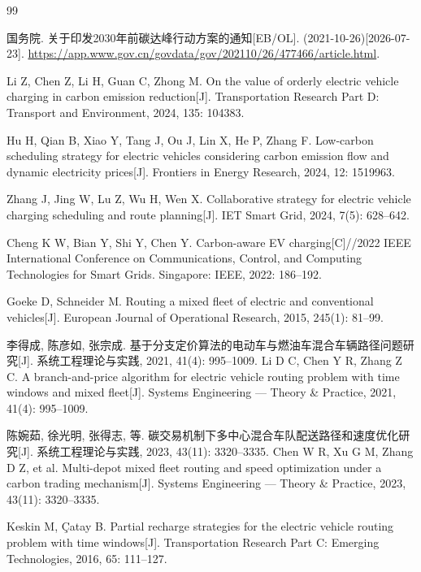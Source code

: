 \documentclass{setp-new}
\begin{document}

\begin{thebibliography}{99}

 国务院. 关于印发2030年前碳达峰行动方案的通知[EB/OL]. (2021-10-26)[2026-07-23].
\url{https://app.www.gov.cn/govdata/gov/202110/26/477466/article.html}.

 Li Z, Chen Z, Li H, Guan C, Zhong M. On the value of orderly electric vehicle charging in carbon emission reduction[J]. Transportation Research Part D: Transport and Environment, 2024, 135: 104383.

 Hu H, Qian B, Xiao Y, Tang J, Ou J, Lin X, He P, Zhang F. Low-carbon scheduling strategy for electric vehicles considering carbon emission flow and dynamic electricity prices[J]. Frontiers in Energy Research, 2024, 12: 1519963.

 Zhang J, Jing W, Lu Z, Wu H, Wen X. Collaborative strategy for electric vehicle charging scheduling and route planning[J]. IET Smart Grid, 2024, 7(5): 628--642.

 Cheng K W, Bian Y, Shi Y, Chen Y. Carbon-aware EV charging[C]//2022 IEEE International Conference on Communications, Control, and Computing Technologies for Smart Grids. Singapore: IEEE, 2022: 186--192.

 Goeke D, Schneider M. Routing a mixed fleet of electric and conventional vehicles[J]. European Journal of Operational Research, 2015, 245(1): 81--99.

 李得成, 陈彦如, 张宗成. 基于分支定价算法的电动车与燃油车混合车辆路径问题研究[J]. 系统工程理论与实践, 2021, 41(4): 995--1009.\newline
Li D C, Chen Y R, Zhang Z C. A branch-and-price algorithm for electric vehicle routing problem with time windows and mixed fleet[J]. Systems Engineering --- Theory \& Practice, 2021, 41(4): 995--1009.

 陈婉茹, 徐光明, 张得志, 等. 碳交易机制下多中心混合车队配送路径和速度优化研究[J]. 系统工程理论与实践, 2023, 43(11): 3320--3335.\newline
Chen W R, Xu G M, Zhang D Z, et al. Multi-depot mixed fleet routing and speed optimization under a carbon trading mechanism[J]. Systems Engineering --- Theory \& Practice, 2023, 43(11): 3320--3335.

 Keskin M, \c{C}atay B. Partial recharge strategies for the electric vehicle routing problem with time windows[J]. Transportation Research Part C: Emerging Technologies, 2016, 65: 111--127.


\end{thebibliography}
\end{document}
